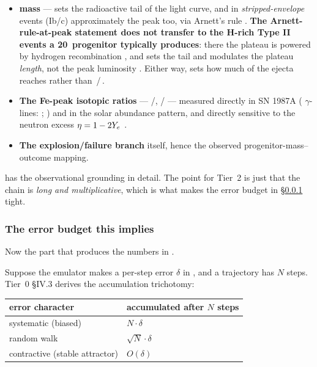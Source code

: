 \begin{itemize}
\item \textbf{ mass} --- sets the radioactive tail of the light
  curve, and in \emph{stripped-envelope} events (Ib/c) approximately the peak
  too, via Arnett's rule \citep[applied to SE-SN samples in e.g.
  \citealp{lyman2016}]{arnett1982}. \textbf{The Arnett-rule-at-peak statement
  does not transfer to the H-rich Type II events a 20\,\Msun{} progenitor
  typically produces}: there the plateau is powered by hydrogen recombination
  \citep{popov1993, kasen2009}, and  sets the tail and modulates the
  plateau \emph{length}, not the peak luminosity \citep{kasen2009, nakar2016}.
  Either way, \Ye{} sets how much of the ejecta reaches  rather than
  \,/\,.
\item \textbf{The Fe-peak isotopic ratios} --- /,
  / --- measured directly in SN 1987A (
  $\gamma$-lines: \citealp{kurfess1992}; \citealp{seitenzahl2014}) and in the
  solar abundance pattern, and directly sensitive to the neutron excess
  $\eta = 1 - 2Y_{e}$ \citep{wac1973, thielemann1996}.
\item \textbf{The explosion/failure branch} itself, hence the observed
  progenitor-mass--outcome mapping.
\end{itemize}

 has the observational grounding in detail. The point for
Tier~2 is just that the chain is \emph{long and multiplicative}, which is what
makes the error budget in \S\ref{sec:budget} tight.

\subsubsection{The error budget this implies}
\label{sec:budget}

Now the part that produces the numbers in .

Suppose the emulator makes a per-step error $\delta$ in \Ye, and a trajectory
has $N$ steps. Tier~0 \S IV.3 derives the accumulation trichotomy:

\begin{center}
\begin{tabular}{@{}ll@{}}
\toprule
\textbf{error character} & \textbf{accumulated after $N$ steps} \\
\midrule
systematic (biased)              & $N\cdot\delta$ \\
random walk                      & $\sqrt N\cdot\delta$ \\
contractive (stable attractor)   & $O(\delta)$ \\
\bottomrule
\end{tabular}
\end{center}

